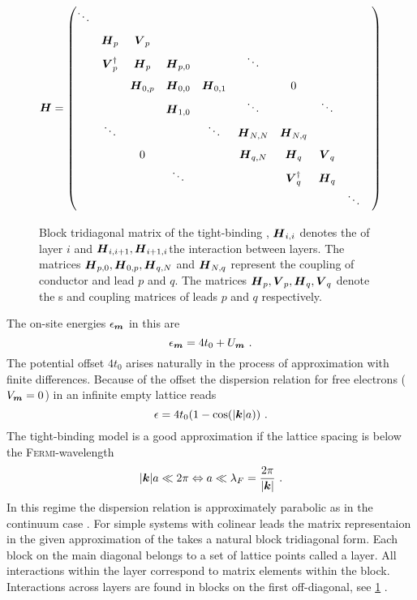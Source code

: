 \begin{figure}[h!]
\centering
\begin{align*}
\mat{H}=
\renewcommand*{\arraystretch}{1.6}
\begin{pmatrix} 
\ddots& & & & & & & & & \\
& \mat{H}_p& \mat{V}_p& & & && &&\\
& \mat{V}^{\dagger}_p& \mat{H}_p& \mat{H}_{p,0}& &\ddots& & &\\
& &\mat{H}_{0,p}&\mat{H}_{0,0} &\mat{H}_{0,1} & &0 & &\\
& & &\mat{H}_{1,0}& &\ddots & &\ddots &\\
& \ddots& & &\ddots &\mat{H}_{N,N} &\mat{H}_{N,q}& & \\
& &0 & & &\mat{H}_{q,N} &\mat{H}_q &\mat{V}_q&\\
& & &\ddots & & &\mat{V}^{\dagger}_q &\mat{H}_q&\\
& & & & & & & &\ddots
\end{pmatrix}
\end{align*}
\caption{Block tridiagonal matrix of the tight-binding \hamil{}, $\boldsymbol{H}_{i,i}$ denotes the \hamil{} of layer $i$ and $\boldsymbol{H}_{i,i+1},\boldsymbol{H}_{i+1,i}$the interaction between layers. The matrices $\boldsymbol{H}_{p,0},\boldsymbol{H}_{0,p},\boldsymbol{H}_{q,N}$ and $\boldsymbol{H}_{N,q}$ represent the coupling of conductor and lead $p$ and $q$. The matrices $\boldsymbol{H}_p,\boldsymbol{V}_p,\boldsymbol{H}_q,\boldsymbol{V}_q$ denote the \hamil s and coupling matrices of leads $p$ and $q$ respectively.}
\label{fig:blocktridiagonal}
\end{figure}
The on-site energies $\epsilon_{\boldsymbol{m}}$ in this \hamil{} are
\begin{equation}
\epsilon_{\boldsymbol{m}} = 4t_0 + U_{\boldsymbol{m}}\ .
\end{equation}
The potential offset $4t_0$ arises naturally in the process of approximation with finite differences. Because of the offset the dispersion relation for free electrons ($V_{\boldsymbol{m}}=0$) in an infinite empty lattice reads
\begin{equation}
\epsilon = 4t_0(1-\text{cos}(\lvert\boldsymbol{k}\rvert a))\ .
\end{equation}
The tight-binding model is a good approximation if the lattice spacing is below the \textsc{Fermi}-wavelength
\begin{equation}
\lvert\boldsymbol{k}\rvert a \ll  2\pi \Leftrightarrow a \ll \lambda_F = \frac{2\pi}{\lvert\boldsymbol{k}\rvert} \ .
\end{equation}
In this regime the dispersion relation is approximately parabolic as in the continuum case \cite{Metalidis2007Thesis}.
For simple systems with colinear leads the matrix representaion in the given approximation of the \hamil{} takes a natural block tridiagonal form. Each block on the main diagonal belongs to a set of lattice points called a layer. All interactions within the layer correspond to matrix elements within the block. Interactions across layers are found in blocks on the first off-diagonal, see \cref{fig:blocktridiagonal} \cite{AnLunNik2008}.
